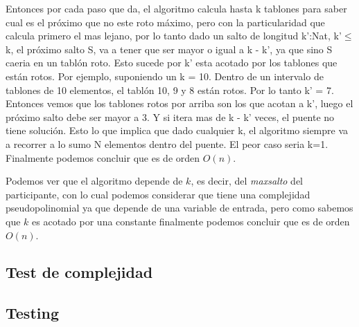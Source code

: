 
Entonces por cada paso que da, el algoritmo calcula hasta k tablones para saber cual es el pr\'oximo que no este roto m\'aximo, pero con la particularidad que calcula primero el mas lejano, por lo tanto dado un salto de longitud k':Nat, k'$\leq$ k, el pr\'oximo salto S, va a tener que ser mayor o igual a k - k', ya que sino S caeria en un tabl\'on roto.
Esto sucede por k' esta acotado por los tablones que est\'an rotos.
Por ejemplo, suponiendo un k = 10. Dentro de un intervalo de tablones de 10 elementos, el tabl\'on 10, 9 y 8 est\'an rotos. Por lo tanto k' = 7. Entonces vemos que los tablones rotos por arriba son los que acotan a k', luego el pr\'oximo salto debe ser mayor a 3. Y si itera mas de k - k' veces, el puente no tiene soluci\'on.
Esto lo que implica que dado cualquier k, el algoritmo siempre va a recorrer a lo sumo N elementos dentro del puente. El peor caso seria k=1.
Finalmente podemos concluir que es de orden $O(n)$.


Podemos ver que el algoritmo depende de $k$, es decir, del \textit{maxsalto} del participante, con lo cual podemos considerar que tiene una complejidad pseudopolinomial ya que depende de una variable de entrada, pero como sabemos que $k$ es acotado por una constante finalmente podemos concluir que es de orden $O(n)$.

\subsection{Test de complejidad}

\subsection{Testing}
